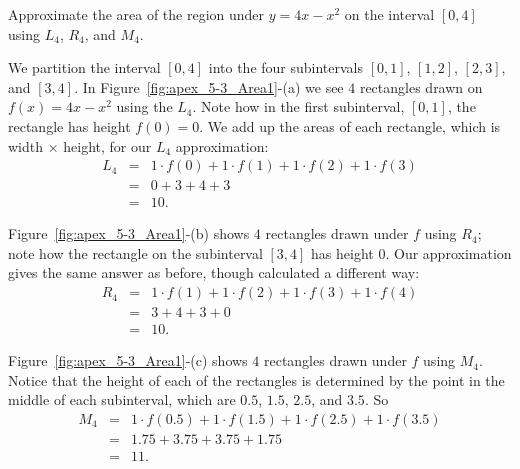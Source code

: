 \begin{example} %
Approximate the area of the region under $y=4x-x^2$ on the interval $[0,4]$ using $L_4$, $R_4$, and $M_4$. 

\solution We partition the interval $[0,4]$ into the four subintervals $[0,1]$, $[1,2]$, $[2,3]$, and $[3,4]$. In Figure~\ref{fig:apex_5-3_Area1}-(a) we see $4$ rectangles drawn on $f(x) = 4x-x^2$ using the $L_4$. Note how in the first subinterval, $[0,1]$, the rectangle has height $f(0)=0$. We add up the areas of each rectangle, which is width $\times$ height, for our $L_4$ approximation:
\begin{eqnarray*}
L_4 & = & 1 \cdot f(0) + 1 \cdot f(1)+ 1 \cdot f(2) + 1 \cdot f(3) \\
& = & 0+3+4+3 \\
& = & 10.
\end{eqnarray*}
	
Figure~\ref{fig:apex_5-3_Area1}-(b) shows $4$ rectangles drawn under $f$ using $R_4$; note how the rectangle on the subinterval $[3,4]$ has height $0$.  Our approximation gives the same answer as before, though calculated a different way:
\begin{eqnarray*}
R_4 & = & 1 \cdot f(1) + 1 \cdot f(2)+ 1 \cdot f(3) + 1 \cdot f(4) \\
& = & 3+4+3+0 \\
& = & 10.
\end{eqnarray*}

Figure~\ref{fig:apex_5-3_Area1}-(c) shows $4$ rectangles drawn under $f$ using $M_4$. Notice that the height of each of the rectangles is determined by the point in the middle of each subinterval, which are $0.5$, $1.5$, $2.5$, and $3.5$. So
\begin{eqnarray*}
M_4 & = & 1 \cdot f(0.5) + 1 \cdot f(1.5)+ 1 \cdot f(2.5) + 1 \cdot f(3.5) \\
& = & 1.75 + 3.75 + 3.75 + 1.75 \\
& = & 11.
\end{eqnarray*}
\end{example}

